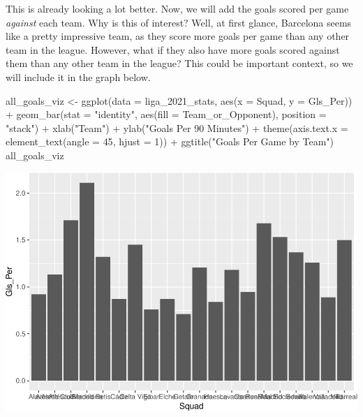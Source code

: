 \documentclass[
  11pt,
]{book}
\newenvironment{Shaded}{\begin{snugshade}}{\end{snugshade}}
\newcommand{\AttributeTok}[1]{\textcolor[rgb]{0.77,0.63,0.00}{#1}}
\newcommand{\DecValTok}[1]{\textcolor[rgb]{0.00,0.00,0.81}{#1}}
\newcommand{\FunctionTok}[1]{\textcolor[rgb]{0.00,0.00,0.00}{#1}}
\newcommand{\NormalTok}[1]{#1}
\newcommand{\OtherTok}[1]{\textcolor[rgb]{0.56,0.35,0.01}{#1}}
\newcommand{\SpecialCharTok}[1]{\textcolor[rgb]{0.00,0.00,0.00}{#1}}
\newcommand{\StringTok}[1]{\textcolor[rgb]{0.31,0.60,0.02}{#1}}
\theoremstyle{definition}
\theoremstyle{definition}
\theoremstyle{definition}
\theoremstyle{definition}
\theoremstyle{remark}
\begin{document}
This is already looking a lot better. Now, we will add the goals scored per game \emph{against} each team. Why is this of interest? Well, at first glance, Barcelona seems like a pretty impressive team, as they score more goals per game than any other team in the league. However, what if they also have more goals scored against them than any other team in the league? This could be important context, so we will include it in the graph below.

\begin{Shaded}
\begin{Highlighting}[]
\NormalTok{all\_goals\_viz }\OtherTok{\textless{}{-}} \FunctionTok{ggplot}\NormalTok{(}\AttributeTok{data =}\NormalTok{ liga\_2021\_stats, }\FunctionTok{aes}\NormalTok{(}\AttributeTok{x =}\NormalTok{ Squad, }\AttributeTok{y =}\NormalTok{ Gls\_Per)) }\SpecialCharTok{+} \FunctionTok{geom\_bar}\NormalTok{(}\AttributeTok{stat =} \StringTok{"identity"}\NormalTok{,}
    \FunctionTok{aes}\NormalTok{(}\AttributeTok{fill =}\NormalTok{ Team\_or\_Opponent), }\AttributeTok{position =} \StringTok{"stack"}\NormalTok{) }\SpecialCharTok{+} \FunctionTok{xlab}\NormalTok{(}\StringTok{"Team"}\NormalTok{) }\SpecialCharTok{+} \FunctionTok{ylab}\NormalTok{(}\StringTok{"Goals Per 90 Minutes"}\NormalTok{) }\SpecialCharTok{+}
    \FunctionTok{theme}\NormalTok{(}\AttributeTok{axis.text.x =} \FunctionTok{element\_text}\NormalTok{(}\AttributeTok{angle =} \DecValTok{45}\NormalTok{, }\AttributeTok{hjust =} \DecValTok{1}\NormalTok{)) }\SpecialCharTok{+} \FunctionTok{ggtitle}\NormalTok{(}\StringTok{"Goals Per Game by Team"}\NormalTok{)}
\NormalTok{all\_goals\_viz}
\end{Highlighting}
\end{Shaded}

\includegraphics{series_files/figure-latex/unnamed-chunk-40-1.pdf}
\end{document}
